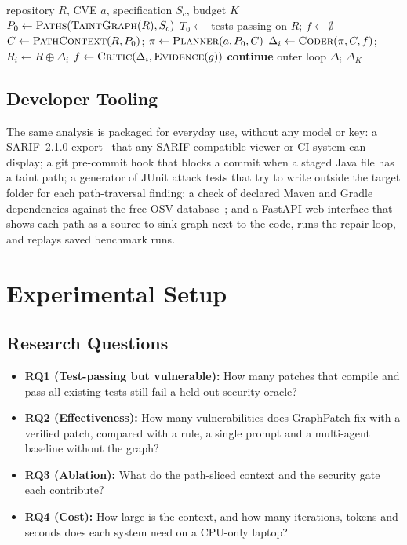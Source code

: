 \documentclass[conference]{IEEEtran}
\begin{document}
\begin{algorithm}[t]
\caption{Graph-verified repair loop}
\label{alg:loop}
\small
\begin{algorithmic}[1]
\Require repository $R$, CVE $a$, specification $S_c$, budget $K$
\State $P_0 \gets \Call{Paths}{\textsc{TaintGraph}(R), S_c}$
\State $T_0 \gets$ tests passing on $R$; $f \gets \emptyset$
\State $C \gets \Call{PathContext}{R, P_0}$; $\pi \gets \Call{Planner}{a, P_0, C}$
  \State $\Delta_i \gets \Call{Coder}{\pi, C, f}$; $R_i \gets R \oplus \Delta_i$
      \State $f \gets \Call{Critic}{\Delta_i, \textsc{Evidence}(g)}$
      \State \textbf{continue} outer loop
    \EndIf
  \EndFor
  \State \Return $\Delta_i$ 
\EndFor
\State \Return $\Delta_K$ 
\end{algorithmic}
\end{algorithm}

\subsection{Developer Tooling}
The same analysis is packaged for everyday use, without any model or key: a SARIF~2.1.0
export~\cite{sarif} that any SARIF-compatible viewer or CI system can display; a git
pre-commit hook that blocks a commit when a staged Java file has a taint path; a
generator of JUnit attack tests that try to write outside the target folder for each
path-traversal finding; a check of declared Maven and Gradle dependencies against the
free OSV database~\cite{osv}; and a FastAPI web interface that shows each path as a
source-to-sink graph next to the code, runs the repair loop, and replays saved benchmark
runs.

\section{Experimental Setup}
\label{sec:setup}

\subsection{Research Questions}
\begin{itemize}
\item \textbf{RQ1 (Test-passing but vulnerable):} How many patches that compile and pass
all existing tests still fail a held-out security oracle?
\item \textbf{RQ2 (Effectiveness):} How many vulnerabilities does GraphPatch fix with a
verified patch, compared with a rule, a single prompt and a multi-agent baseline without
the graph?
\item \textbf{RQ3 (Ablation):} What do the path-sliced context and the security gate
each contribute?
\item \textbf{RQ4 (Cost):} How large is the context, and how many iterations, tokens and
seconds does each system need on a CPU-only laptop?
\end{itemize}
\end{document}
